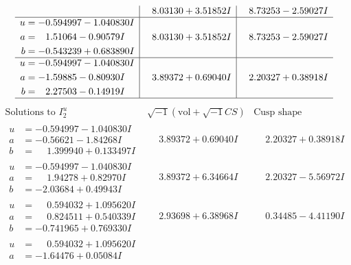 \documentclass[1p]{elsarticle_modified}
\theoremstyle{definition}
\newcommand{\I}{\sqrt{-1}}
\begin{document}
$$\begin{array}{c|c|c}
 & \phantom{-}8.03130 + 3.51852 I & \phantom{-}8.73253 - 2.59027 I \\ \hline\begin{aligned}
u &= -0.594997 - 1.040830 I \\
a &= \phantom{-}1.51064 - 0.90579 I \\
b &= -0.543239 + 0.683890 I\end{aligned}
 & \phantom{-}8.03130 + 3.51852 I & \phantom{-}8.73253 - 2.59027 I \\ \hline\begin{aligned}
u &= -0.594997 - 1.040830 I \\
a &= -1.59885 - 0.80930 I \\
b &= \phantom{-}2.27503 - 0.14919 I\end{aligned}
 & \phantom{-}3.89372 + 0.69040 I & \phantom{-}2.20327 + 0.38918 I\\
 \hline 
 \end{array}$$\newpage$$\begin{array}{c|c|c}  
\text{Solutions to }I^u_{2}& \I (\text{vol} + \sqrt{-1}CS) & \text{Cusp shape}\\
 \hline 
\begin{aligned}
u &= -0.594997 - 1.040830 I \\
a &= -0.56621 - 1.84268 I \\
b &= \phantom{-}1.399940 + 0.133497 I\end{aligned}
 & \phantom{-}3.89372 + 0.69040 I & \phantom{-}2.20327 + 0.38918 I \\ \hline\begin{aligned}
u &= -0.594997 - 1.040830 I \\
a &= \phantom{-}1.94278 + 0.82970 I \\
b &= -2.03684 + 0.49943 I\end{aligned}
 & \phantom{-}3.89372 + 6.34664 I & \phantom{-}2.20327 - 5.56972 I \\ \hline\begin{aligned}
u &= \phantom{-}0.594032 + 1.095620 I \\
a &= \phantom{-}0.824511 + 0.540339 I \\
b &= -0.741965 + 0.769330 I\end{aligned}
 & \phantom{-}2.93698 + 6.38968 I & \phantom{-}0.34485 - 4.41190 I \\ \hline\begin{aligned}
u &= \phantom{-}0.594032 + 1.095620 I \\
a &= -1.64476 + 0.05084 I \\

\end{aligned}
\end{array}$$
\end{document}
